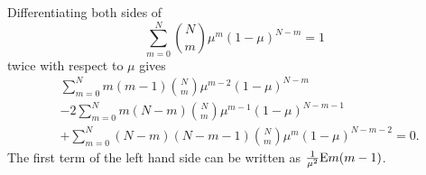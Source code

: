 Differentiating both sides of 
%
\begin{equation}
\sum_{m = 0}^{N} {N \choose m} \mu ^ m (1 - \mu) ^ {N - m}  = 1
\end{equation}
%
twice with respect to $\mu$ gives
%
\begin{equation}
\begin{aligned}
&\sum_{m = 0}^{N} m (m - 1) {N \choose m} \mu ^ {m - 2} (1 - \mu) ^ {N - m} \\
&- 2 \sum_{m = 0}^{N} m (N - m) {N \choose m} \mu ^ {m - 1} (1 - \mu) ^ {N - m - 1} \\
&+ \sum_{m = 0}^{N} (N - m) (N - m - 1) {N \choose m} \mu ^ m (1 - \mu) ^ {N - m - 2} = 0.
\end{aligned}
\end{equation}
%
The first term of the left hand side can be written as $\frac{1}{\mu ^ 2} {\rm E} m (m - 1)$.





















